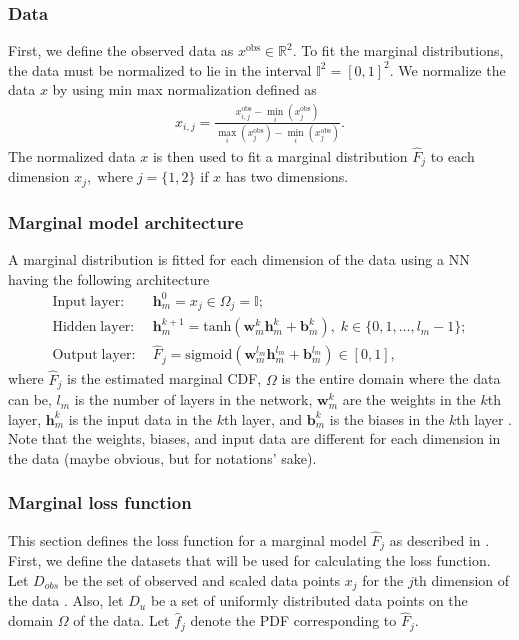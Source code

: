 \subsubsection{Data}
First, we define the observed data as $x^{\mathrm{obs}}\in \mathbb{R}^2 $. To fit the marginal distributions, the data must be normalized to lie in the interval $\mathbb{I}^2 = [0,1]^2$. We normalize the data $x$ by using min max normalization defined as
\begin{align*}
    x_{i,j} = \frac{x_{i,j}^{\mathrm{obs}} - \min_i(x_{j}^{\mathrm{obs}})}{  \max_i(x_{j}^{\mathrm{obs}})- \min_i(x_{j}^{\mathrm{obs}})}.
\end{align*}
The normalized data $x$ is then used to fit a marginal distribution $\hat{F}_j$ to each dimension $x_j, \; \mathrm{where} \; j=\{1,2\}$ if $x$ has two dimensions. 


\subsubsection{Marginal model architecture}
A marginal distribution is fitted for each dimension of the data using a \gls{NN} having the following architecture 
\begin{align*}
    \mathrm{Input\;layer:} \; & \mathbf{h}_m^0 = x_j \in \Omega_j = \mathbb{I}; \\
    \mathrm{Hidden\;layer:} \; & \mathbf{h}_m^{k+1} = \mathrm{tanh}(\mathbf{w}_m^{k} \mathbf{h}_m^{k} + \mathbf{b}_m^{k}), \; k \in \{0,1, \dots, l_m -1 \};\\
    \mathrm{Output\;layer:} \; & \hat{F}_j = \mathrm{sigmoid}(\mathbf{w}_m^{l_m} \mathbf{h}_m^{l_m} + \mathbf{b}_m^{l_m}) \in \left[0,1 \right],
\end{align*}
where $\hat{F}_j$ is the estimated marginal \gls{CDF}, $\Omega$ is the entire domain where the data can be, $l_m$ is the number of layers in the network, $\mathbf{w}_m^{k}$ are the weights in the $k$th layer,  $\mathbf{h}_m^{k}$ is the input data in the $k$th layer, and $\mathbf{b}_m^{k}$ is the biases in the $k$th layer . Note that the weights, biases, and input data are different for each dimension in the data (maybe obvious, but for notations' sake). 

\subsubsection{Marginal loss function}\label{sec:NeuralMarginalLoss}
This section defines the loss function for a marginal model $\hat{F}_j$ as described in . First, we define the datasets that will be used for calculating the loss function. Let $D_{obs}$ be the set of observed and scaled data points $x_j$ for the $j$th dimension of the data . Also, let $D_u$ be a set of uniformly distributed data points on the domain $\Omega$  of the data. Let $\hat{f}_j$ denote the \gls{PDF} corresponding to $\hat{F}_j$.

